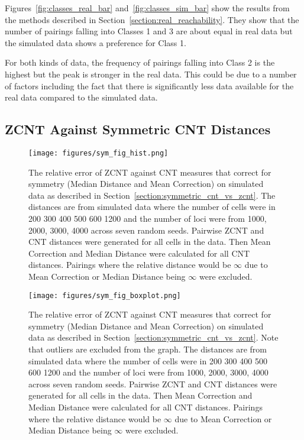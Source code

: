 Figures~\ref{fig:classes_real_bar} and~\ref{fig:classes_sim_bar} show the results from the methods described in Section~\ref{section:real_reachability}. They show that the number of pairings falling into Classes 1 and 3 are about equal in real data but the simulated data shows a preference for Class 1. 

For both kinds of data, the frequency of pairings falling into Class 2 is the highest but the peak is stronger in the real data. This could be due to a number of factors including the fact that there is significantly less data available for the real data compared to the simulated data. 

\subsection{ZCNT Against Symmetric CNT Distances}\label{section:symmetric_cnt_vs_zcnt_res}

\begin{figure}[ht]
    \centering 
    \texttt{[image: figures/sym\_fig\_hist.png]}
    \caption{The relative error of ZCNT against CNT measures that correct for symmetry (Median Distance and Mean Correction) on simulated data as described in Section~\ref{section:symmetric_cnt_vs_zcnt}. The distances are from simulated data where the number of cells were in {200 300 400 500 600 1200} and the number of loci were from {1000, 2000, 3000, 4000} across seven random seeds. Pairwise ZCNT and CNT distances were generated for all cells in the data. Then Mean Correction and Median Distance were calculated for all CNT distances. Pairings where the relative distance would be $\infty$ due to Mean Correction or Median Distance being $\infty$ were excluded.}\label{fig:symmetric_rel_err_hist}
\end{figure}

\begin{figure}[ht]
    \centering
    \texttt{[image: figures/sym\_fig\_boxplot.png]}
    \caption{The relative error of ZCNT against CNT measures that correct for symmetry (Median Distance and Mean Correction) on simulated data as described in Section~\ref{section:symmetric_cnt_vs_zcnt}. Note that outliers are excluded from the graph. The distances are from simulated data where the number of cells were in {200 300 400 500 600 1200} and the number of loci were from {1000, 2000, 3000, 4000} across seven random seeds. Pairwise ZCNT and CNT distances were generated for all cells in the data. Then Mean Correction and Median Distance were calculated for all CNT distances. Pairings where the relative distance would be $\infty$ due to Mean Correction or Median Distance being $\infty$ were excluded.}\label{fig:symmetric_rel_err_box}
\end{figure}

